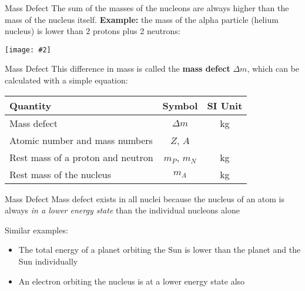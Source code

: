 \documentclass[12pt,compress,aspectratio=169]{beamer}
\newcommand{\pic}[2]{\texttt{[image: \#2]}}
\newcommand{\eq}[2]{
  \vspace{#1}{\Large\begin{displaymath}#2\end{displaymath}}
}
\begin{document}
\begin{frame}{Mass Defect}
  The sum of the masses of the nucleons are always higher than the mass of the
  nucleus itself. \textbf{Example:} the mass of the alpha particle (helium
  nucleus) is lower than 2 protons plus 2 neutrons:
  \begin{center}
    \pic{.45}{graphics/nucbind}
  \end{center}
\end{frame}



\begin{frame}{Mass Defect}
  This difference in mass is called the \textbf{mass defect} $\Delta m$, which
  can be calculated with a simple equation:
  
  \eq{-.2in}{
    \boxed{
      \Delta m=\left[Zm_P+(A-Z)m_N\right]-m_A
    }
  }
  \begin{center}
    \begin{tabular}{l|c|c}
      \rowcolor{pink}
      \textbf{Quantity}        & \textbf{Symbol} & \textbf{SI Unit} \\ \hline
      Mass defect              & $\Delta m$ & \si{\kilo\gram}\\
      Atomic number and mass numbers & $Z$, $A$ & \\
      Rest mass of a proton and neutron & $m_P$, $m_N$ & \si{\kilo\gram}\\
      Rest mass of the nucleus & $m_A$ & \si{\kilo\gram}\\
    \end{tabular}
  \end{center}
\end{frame}



\begin{frame}{Mass Defect}
  Mass defect exists in all nuclei because the nucleus of an atom is always
  \emph{in a lower energy state} than the individual nucleons alone
  
  \vspace{.25in}Similar examples:
  \begin{itemize}
  \item The total energy of a planet orbiting the Sun is lower than the planet
    and the Sun individually
  \item An electron orbiting the nucleus is at a lower energy state also
  \end{itemize}
\end{frame}
\end{document}
